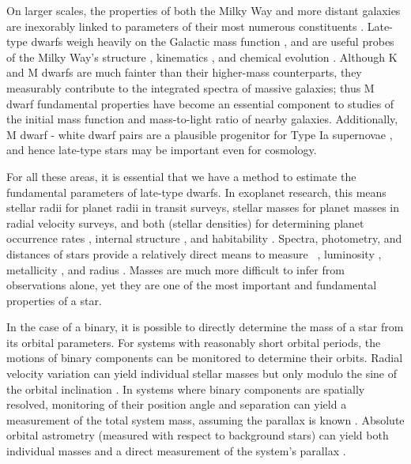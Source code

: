 \documentclass[twocolumn]{aastex62}
\begin{document}
On larger scales, the properties of both the Milky Way and more distant galaxies are inexorably linked to parameters of their most numerous constituents \citep[$>70$\% of stars in the Solar neighborhood are M dwarfs,][]{Henry:1994fk,Reid:2004lr}. Late-type dwarfs weigh heavily on the Galactic mass function \citep[e.g.,][]{Covey:2008lr}, and are useful probes of the Milky Way's structure \citep[e.g.,][]{2008ApJ...673..864J,2017ApJ...843..141F}, kinematics \citep[e.g.,][]{2007AJ....134.2418B,2015RAA....15..860Y}, and chemical evolution \citep{Woolf:2012lr,2015AJ....149..140H}. Although K and M dwarfs are much fainter than their higher-mass counterparts, they measurably contribute to the integrated spectra of massive galaxies; thus M dwarf fundamental properties have become an essential component to studies of the initial mass function \citep[e.g.,][]{2012ApJ...747...69C,2016ApJ...821...39M} and mass-to-light ratio \citep{2015MNRAS.452L..21S} of nearby galaxies. Additionally, M dwarf - white dwarf pairs are a plausible progenitor for Type Ia supernovae \citep{2012ApJ...758..123W}, and hence late-type stars may be important even for cosmology.

For all these areas, it is essential that we have a method to estimate the fundamental parameters of late-type dwarfs. In exoplanet research, this means stellar radii for planet radii in transit surveys, stellar masses for planet masses in radial velocity surveys, and both (stellar densities) for determining planet occurrence rates \citep[e.g.,][]{2010exop.book...55W,Gaidos2013}, internal structure \citep[e.g.,][]{Rogers:2011lr}, and habitability \citep[e.g.,][]{Gaidos2013a,Kane2017}. Spectra, photometry, and distances of stars provide a relatively direct means to measure \teff\ \citep[e.g.,][]{Rojas-Ayala:2012uq,Mann2013c}, luminosity \citep[e.g.,][]{2002AJ....124.2721R}, metallicity \citep[e.g.,][]{Bonfils:2005,RojasAyala:2010}, and radius \citep[e.g., via Stefan-Boltzmann, ][]{Newton2015A,Kesseli:2018aa}. Masses are much more difficult to infer from observations alone, yet they are one of the most important and fundamental properties of a star.  

In the case of a binary, it is possible to directly determine the mass of a star from its orbital parameters. For systems with reasonably short orbital periods, the motions of binary components can be monitored to determine their orbits. Radial velocity variation can yield individual stellar masses but only modulo the sine of the orbital inclination \citep[e.g.,][]{Torres2002,Kraus2011,Stevens:2018aa}. In systems where binary components are spatially resolved, monitoring of their position angle and separation can yield a measurement of the total system mass, assuming the parallax is known \citep[e.g.,][]{Soderhjelm1999,Woi2003,2009ApJ...699..168D}. Absolute orbital astrometry (measured with respect to background stars) can yield both individual masses and a direct measurement of the system's parallax \citep[e.g.,][]{Koh2012,Benedict2016}. 
\end{document}
